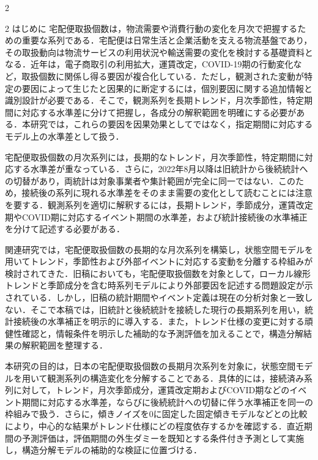 \documentclass[uplatex,a4paper,10pt]{jsarticle}
\makeatletter
\renewcommand{\section}{\@startsection{section}{1}{\z@}%
  {2\baselineskip}{\baselineskip}%
  {\normalfont\gtfamily\bfseries\fontsize{11pt}{13pt}\selectfont}}
\makeatother
\begin{document}
\begin{multicols}{2}

\section{はじめに}
宅配便取扱個数は，物流需要や消費行動の変化を月次で把握するための重要な系列である．宅配便は日常生活と企業活動を支える物流基盤であり，その取扱動向は物流サービスの利用状況や輸送需要の変化を検討する基礎資料となる．近年は，電子商取引の利用拡大，運賃改定，COVID-19期の行動変化など，取扱個数に関係し得る要因が複合化している．ただし，観測された変動が特定の要因によって生じたと因果的に断定するには，個別要因に関する追加情報と識別設計が必要である．そこで，観測系列を長期トレンド，月次季節性，特定期間に対応する水準差に分けて把握し，各成分の解釈範囲を明確にする必要がある．本研究では，これらの要因を因果効果としてではなく，指定期間に対応するモデル上の水準差として扱う．

宅配便取扱個数の月次系列には，長期的なトレンド，月次季節性，特定期間に対応する水準差が重なっている．さらに，2022年8月以降は旧統計から後続統計への切替があり，両統計は対象事業者や集計範囲が完全に同一ではない．このため，接続後の系列に現れる水準差をそのまま需要の変化として読むことには注意を要する．観測系列を適切に解釈するには，長期トレンド，季節成分，運賃改定期やCOVID期に対応するイベント期間の水準差，および統計接続後の水準補正を分けて記述する必要がある．

関連研究では，宅配便取扱個数の長期的な月次系列を構築し，状態空間モデルを用いてトレンド，季節性および外部イベントに対応する変動を分離する枠組みが検討されてきた\cite{harvey1989,durbin2012}．旧稿においても，宅配便取扱個数を対象として，ローカル線形トレンドと季節成分を含む時系列モデルにより外部要因を記述する問題設定が示されている\cite{akahane2024}．しかし，旧稿の統計期間やイベント定義は現在の分析対象と一致しない．そこで本稿では，旧統計と後続統計を接続した現行の長期系列を用い，統計接続後の水準補正を明示的に導入する．また，トレンド仕様の変更に対する頑健性確認と，情報条件を明示した補助的な予測評価を加えることで，構造分解結果の解釈範囲を整理する．

本研究の目的は，日本の宅配便取扱個数の長期月次系列を対象に，状態空間モデルを用いて観測系列の構造変化を分解することである．具体的には，接続済み系列に対して，トレンド，月次季節成分，運賃改定期およびCOVID期などのイベント期間に対応する水準差，ならびに後続統計への切替に伴う水準補正を同一の枠組みで扱う．さらに，傾きノイズを0に固定した固定傾きモデルなどとの比較により，中心的な結果がトレンド仕様にどの程度依存するかを確認する．直近期間の予測評価は，評価期間の外生ダミーを既知とする条件付き予測として実施し，構造分解モデルの補助的な検証に位置づける．


\end{multicols}
\end{document}
